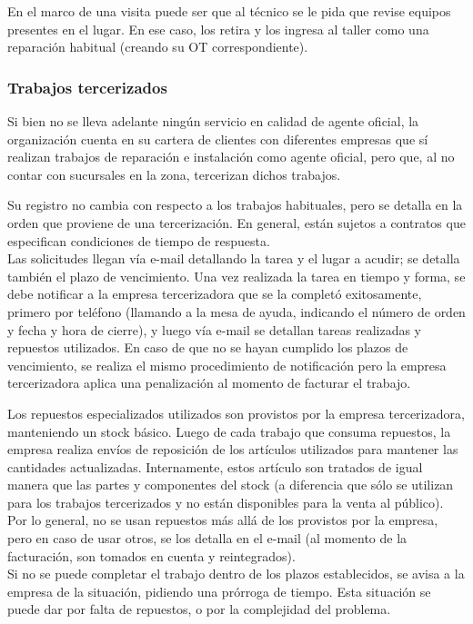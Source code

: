 \documentclass[12pt]{extarticle}
\begin{document}
\begin{spacing}{1.2}
    En el marco de una visita puede ser que al técnico se le pida que revise equipos presentes en el lugar. En ese caso, los retira y los ingresa al taller como una reparación habitual (creando su OT correspondiente).

    \subsubsection{Trabajos tercerizados}
    Si bien no se lleva adelante ningún servicio en calidad de agente oficial, la organización cuenta en su cartera de clientes con diferentes empresas que sí realizan trabajos de reparación e instalación como agente oficial, pero que, al no contar con sucursales en la zona, tercerizan dichos trabajos.

    Su registro no cambia con respecto a los trabajos habituales, pero se detalla en la orden que proviene de una tercerización.
    En general, están sujetos a contratos que especifican condiciones de tiempo de respuesta.\\

    Las solicitudes llegan vía e-mail detallando la tarea y el lugar a acudir; se detalla también el plazo de vencimiento.
    Una vez realizada la tarea en tiempo y forma, se debe notificar a la empresa tercerizadora que se la completó exitosamente, primero por teléfono (llamando a la mesa de ayuda, indicando el número de orden y fecha y hora de cierre), y luego vía e-mail se detallan tareas realizadas y repuestos utilizados.
    En caso de que no se hayan cumplido los plazos de vencimiento, se realiza el mismo procedimiento de notificación pero la empresa tercerizadora aplica una penalización al momento de facturar el trabajo.

    Los repuestos especializados utilizados son provistos por la empresa tercerizadora, manteniendo un stock básico. Luego de cada trabajo que consuma repuestos, la empresa realiza envíos de reposición de los artículos utilizados para mantener las cantidades actualizadas. 
    Internamente, estos artículo son tratados de igual manera que las partes y componentes del stock (a diferencia que sólo se utilizan para los trabajos tercerizados y no están disponibles para la venta al público).
    Por lo general, no se usan repuestos más allá de los provistos por la empresa, pero en caso de usar otros, se los detalla en el e-mail (al momento de la facturación, son tomados en cuenta y reintegrados).\\

    Si no se puede completar el trabajo dentro de los plazos establecidos, se avisa a la empresa de la situación, pidiendo una prórroga de tiempo. Esta situación se puede dar por falta de repuestos, o por la complejidad del problema.


\end{spacing}
\end{document}

